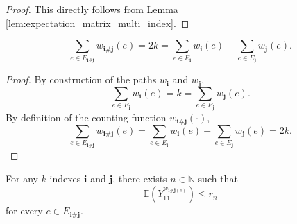 \begin{proof}
  This directly follows from Lemma \ref{lem:expectation_matrix_multi_index}.
\end{proof}
\begin{lemma}
  \notready
  \label{lem:sum_count_edge_pair_eq_length_add_length} 
  \[
  \sum_{e \in E_{\mathbf{i} \# \mathbf{j}}} w_{\mathbf{i} \# \mathbf{j}}(e) 
  = 2k 
  = \sum_{e \in E_\mathbf{i}} w_{\mathbf{i}}(e) + \sum_{e \in E_\mathbf{j}} w_{\mathbf{j}}(e).
  \]
\end{lemma}
\begin{proof}
  By construction of the paths $w_\mathbf{i}$ and $w_\mathbf{j}$,
  \[
  \sum_{e \in E_\mathbf{i}} w_{\mathbf{i}}(e) = k = \sum_{e \in E_\mathbf{j}} w_{\mathbf{j}}(e).
  \]
  By definition of the counting function $w_{\mathbf{i} \# \mathbf{j}}(\cdot)$,
  \[
  \sum_{e \in E_{\mathbf{i} \# \mathbf{j}}} w_{\mathbf{i} \# \mathbf{j}}(e)  
  = \sum_{e \in E_\mathbf{i}} w_{\mathbf{i}}(e) + \sum_{e \in E_\mathbf{j}} w_{\mathbf{j}}(e)
  = 2k.
  \]
\end{proof}
\begin{lemma}
  \notready
  \label{lem:expect_pow_edge_count_pair_le} 
  For any $k$-indexes $\mathbf{i}$ and $\mathbf{j}$, there exists $n \in \mathbb{N}$ such that
  \[
  \mathbb{E} (Y_{11}^{w_{\mathbf{i} \# \mathbf{j} (e)}}) \leq r_n
  \]
  for every $e \in E_{\mathbf{i} \# \mathbf{j}}$.
\end{lemma}

